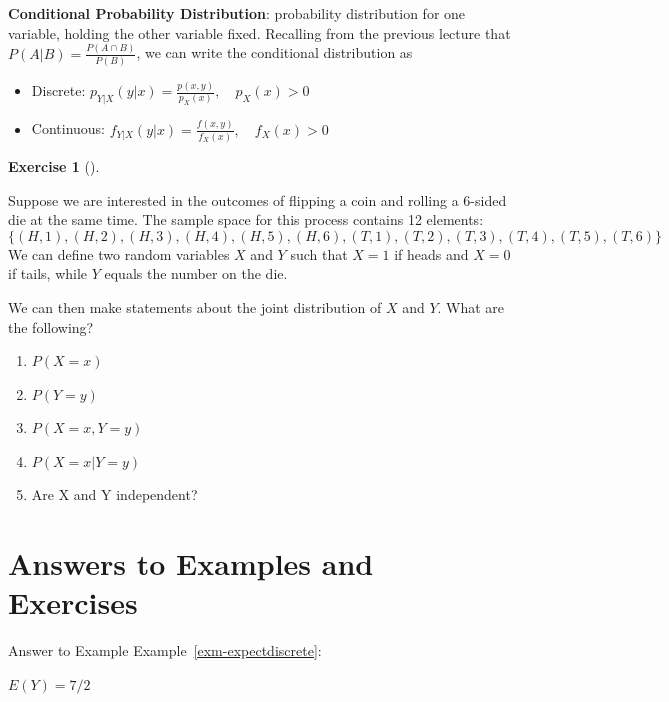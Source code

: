 \documentclass[
  letterpaper,
]{book}
\providecommand{\tightlist}{%
  \setlength{\itemsep}{0pt}\setlength{\parskip}{0pt}}\usepackage{longtable,booktabs,array}
\theoremstyle{definition}
\theoremstyle{definition}
\theoremstyle{plain}
\theoremstyle{definition}
\newtheorem{exercise}{Exercise}[chapter]
\theoremstyle{plain}
\theoremstyle{plain}
\theoremstyle{remark}
\begin{document}
\textbf{Conditional Probability Distribution}: probability distribution
for one variable, holding the other variable fixed. Recalling from the
previous lecture that \(P(A|B)=\frac{P(A\cap B)}{P(B)}\), we can write
the conditional distribution as

\begin{itemize}
\tightlist
\item
  Discrete: \(p_{Y|X}(y|x) = \frac{p(x,y)}{p_X(x)}, \quad p_X(x) > 0\)
\item
  Continuous: \(f_{Y|X}(y|x) = \frac{f(x,y)}{f_X(x)},\quad f_X(x) > 0\)
\end{itemize}

\leavevmode{}%
\begin{exercise}[]\label{exr-}

Suppose we are interested in the outcomes of flipping a coin and rolling
a 6-sided die at the same time. The sample space for this process
contains 12 elements:
\[\{(H, 1), (H, 2), (H, 3), (H, 4), (H, 5), (H, 6), (T, 1), (T, 2), (T, 3), (T, 4), (T, 5), (T, 6)\}\]
We can define two random variables \(X\) and \(Y\) such that \(X = 1\)
if heads and \(X = 0\) if tails, while \(Y\) equals the number on the
die.

We can then make statements about the joint distribution of \(X\) and
\(Y\). What are the following?

\begin{enumerate}
\def\labelenumi{\arabic{enumi}.}
\tightlist
\item
  \(P(X=x)\)
\item
  \(P(Y=y)\)
\item
  \(P(X=x, Y=y)\)
\item
  \(P(X=x|Y=y)\)
\item
  Are X and Y independent?
\end{enumerate}

\end{exercise}

\hypertarget{answers-to-examples-and-exercises-4}{%
\section*{Answers to Examples and
Exercises}\label{answers-to-examples-and-exercises-4}}

Answer to Example Example~\ref{exm-expectdiscrete}:

\(E(Y)=7/2\)
\end{document}

